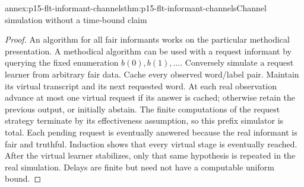 
\begin{annexitem}{annex:p15-flt-informant-channels}{thm:p15-flt-informant-channels}{Channel simulation without a time-bound claim}
\begin{proof}
An algorithm for all fair informants works on the particular
methodical presentation. A methodical algorithm can be used
with a request informant by querying the fixed enumeration
\(b(0),b(1),\ldots\).
Conversely simulate a request learner from arbitrary fair data.
Cache every observed word/label pair. Maintain its virtual
transcript and its next requested word. At each real observation
advance at most one virtual request if its answer is cached;
otherwise retain the previous output, or initially abstain.
The finite computations of the request strategy terminate
by its effectiveness assumption, so this prefix simulator
is total. Each pending request is eventually answered because
the real informant is fair and truthful.
Induction shows that every virtual stage is eventually reached.
After the virtual learner stabilizes, only that same hypothesis
is repeated in the real simulation. Delays are finite but need
not have a computable uniform bound.
\end{proof}
\end{annexitem}

